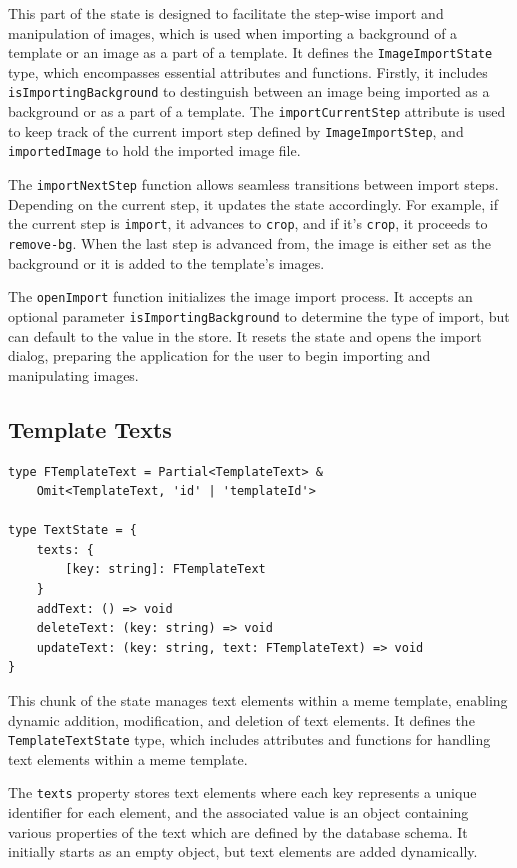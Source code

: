 This part of the state is designed to facilitate the step-wise import and manipulation of images, which is used when importing a background of a template or an image as a part of a template. It defines the \texttt{ImageImportState} type, which encompasses essential attributes and functions. Firstly, it includes \texttt{isImportingBackground} to destinguish between an image being imported as a background or as a part of a template. The \texttt{importCurrentStep} attribute is used to keep track of the current import step defined by \texttt{ImageImportStep}, and \texttt{importedImage} to hold the imported image file.

The \texttt{importNextStep} function allows seamless transitions between import steps. Depending on the current step, it updates the state accordingly. For example, if the current step is \texttt{import}, it advances to \texttt{crop}, and if it's \texttt{crop}, it proceeds to \texttt{remove-bg}. When the last step is advanced from, the image is either set as the background or it is added to the template's images.

The \texttt{openImport} function initializes the image import process. It accepts an optional parameter \texttt{isImportingBackground} to determine the type of import, but can default to the value in the store. It resets the state and opens the import dialog, preparing the application for the user to begin importing and manipulating images.

\subsection{Template Texts}
\begin{verbatim}
type FTemplateText = Partial<TemplateText> &
    Omit<TemplateText, 'id' | 'templateId'>

type TextState = {
    texts: {
        [key: string]: FTemplateText
    }
    addText: () => void
    deleteText: (key: string) => void
    updateText: (key: string, text: FTemplateText) => void
}
\end{verbatim}
This chunk of the state manages text elements within a meme template, enabling dynamic addition, modification, and deletion of text elements. It defines the \texttt{TemplateTextState} type, which includes attributes and functions for handling text elements within a meme template.

The \texttt{texts} property stores text elements where each key represents a unique identifier for each element, and the associated value is an object containing various properties of the text which are defined by the database schema. It initially starts as an empty object, but text elements are added dynamically.

